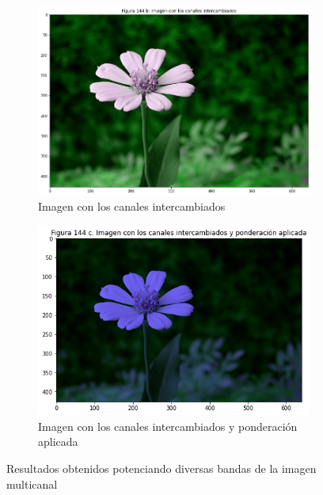 \documentclass[11pt,twoside,titlepage,a4paper]{article}
\numberwithin{equation}{section} %
\theoremstyle{usual}
\begin{document}
\begin{figure}[h]
    \centering
    \begin{subfigure}[t]{.45\textwidth}
        \centering
        \includegraphics[width=\textwidth]{imagenes/PoissonImageEditing_cell_115_output_0.png}
        \caption{Imagen con los canales intercambiados}
        \label{fig:florCanalesIntercambiados}
    \end{subfigure}
    \centering
    \begin{subfigure}[t]{.45\textwidth}
        \centering
        \includegraphics[width=\textwidth]{imagenes/PoissonImageEditing_cell_115_output_1.png}
        \caption{Imagen con los canales intercambiados y ponderación aplicada}
        \label{fig:florCanalesPonderacion}%
    \end{subfigure}
    \caption{Resultados obtenidos potenciando diversas bandas de la imagen multicanal}

\end{figure}
\end{document}

